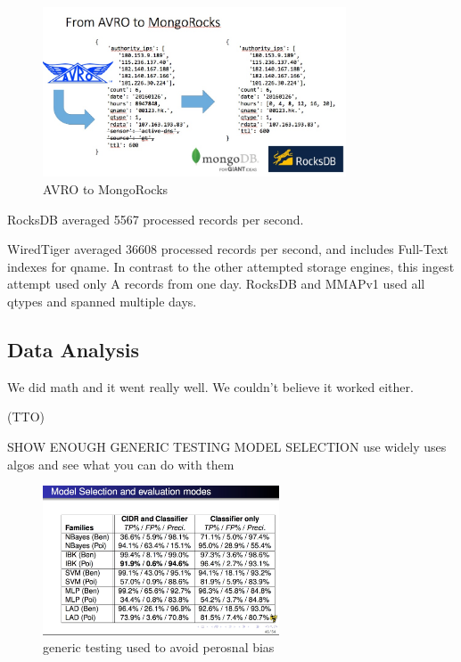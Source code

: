 \documentclass{acm_proc_article-sp}
\begin{document}
\begin{figure}[ht!]
\centering
\includegraphics[width=90mm]{images/20160417 image AVRO to MongoRocks jpeg.jpg}
\caption{AVRO to MongoRocks \label{overflow}}
\end{figure}


RocksDB averaged 5567 processed records per second.

WiredTiger averaged 36608 processed records per second, and includes Full-Text indexes for qname. In contrast to the other attempted storage engines, this ingest attempt used only A records from one day. RocksDB and MMAPv1 used all qtypes and spanned multiple days.

\paragraph{}

\subsection{Data Analysis}
We did math and it went really well. We couldn't believe it worked either.

(TTO)

SHOW ENOUGH GENERIC TESTING MODEL SELECTION  use widely uses algos and see what you can do with them

\begin{figure}[ht!]
\centering
\includegraphics[width=70mm]{images/20160417 image show generic testing to avoid personal bias jpeg.jpg}
\caption{generic testing used to avoid perosnal bias \label{overflow}}
\end{figure}
\end{document}
